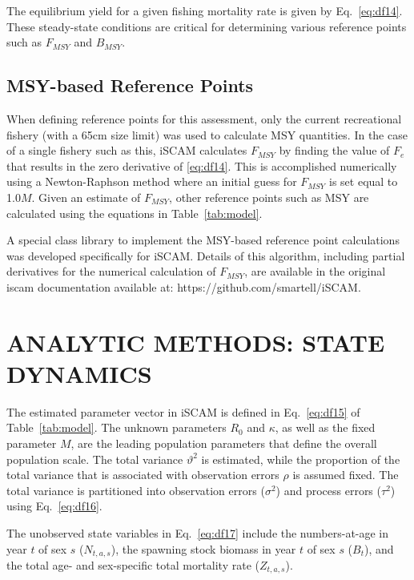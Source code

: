 The equilibrium yield for a given fishing mortality rate is given by Eq.~\ref{eq:df14}. These steady-state conditions are critical for determining various reference points such as $F_{MSY}$ and $B_{MSY}$.

\subsection{MSY-based Reference Points}

When defining reference points for this assessment, only the current recreational fishery (with a 65cm size limit) was used to calculate MSY quantities. In the case of a single fishery such as this, iSCAM calculates $F_{MSY}$ by finding the value of $F_e$ that results in the zero derivative of \ref{eq:df14}. This is accomplished numerically using a Newton-Raphson method where an initial guess for $F_{MSY}$ is set equal to 1.0$M$. Given an estimate of $F_{MSY}$, other reference points such as MSY are calculated using the equations in Table~\ref{tab:model}.

A special class library to implement the MSY-based reference point calculations was developed specifically for iSCAM. Details of this algorithm, including partial derivatives for the numerical calculation of $F_{MSY}$, are available in the original iscam documentation available at: https://github.com/smartell/iSCAM.



\section{ANALYTIC METHODS: STATE DYNAMICS}

The estimated parameter vector in iSCAM is defined in Eq.~\ref{eq:df15} of Table~\ref{tab:model}. The unknown parameters $R_0$ and $\kappa$, as well as the fixed parameter $M$, are the leading population parameters that define the overall population scale. The total variance $\vartheta^2$ is estimated, while the proportion of the total variance that is associated with observation errors $\rho$ is assumed fixed. The total variance is partitioned into observation errors ($\sigma^2$) and process errors ($\tau^2$) using Eq.~\eqref{eq:df16}.

The unobserved state variables in Eq.~\eqref{eq:df17} include the numbers-at-age in year $t$ of sex $s$ ($N_{t,a,s}$), the spawning stock biomass in year $t$ of sex $s$ ($B_t$), and the total age- and sex-specific total mortality rate ($Z_{t,a,s}$).

